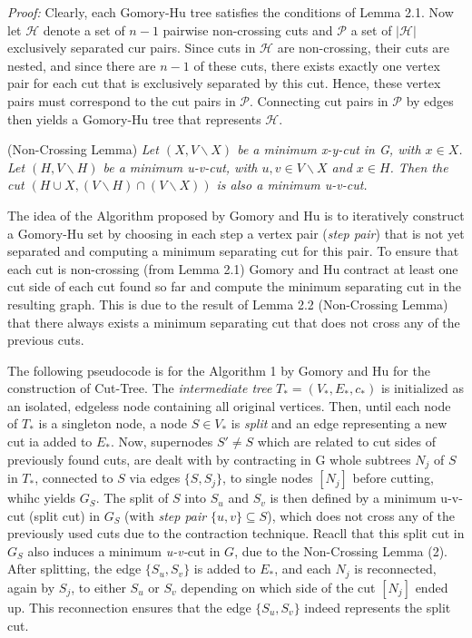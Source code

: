     \vspace{3mm}
    \noindent\textit{Proof:} Clearly, each Gomory-Hu tree satisfies the conditions of Lemma 2.1. Now let $\mathcal{H}$ denote a set of $n-1$ pairwise non-crossing cuts and $\mathcal{P}$ a set of $|\mathcal{H}|$ exclusively separated cur pairs. Since cuts in $\mathcal{H}$ are non-crossing, their cuts are nested, and since there are $n-1$ of these cuts, there exists exactly one vertex pair for each cut that is exclusively separated by this cut. Hence, these vertex pairs must correspond to the cut pairs in $\mathcal{P}$. Connecting cut pairs in $\mathcal{P}$ by edges then yields a Gomory-Hu tree that represents $\mathcal{H}.$

    \vspace{5mm}
     (Non-Crossing Lemma) \textit{Let $(X,V\backslash X)$ be a minimum x-y-cut in G, with $x\in X$. Let $(H,V\backslash H)$ be a minimum u-v-cut, with $u,v\in V\backslash X$ and $x\in H$. Then the cut $(H\cup X, (V\backslash H)\cap (V\backslash X))$ is also a minimum u-v-cut.}
    \vspace{5mm}

    \noindent The idea of the Algorithm proposed by Gomory and Hu is to iteratively construct a Gomory-Hu set by choosing in each step a vertex pair (\textit{step pair}) that is not yet separated and computing a minimum separating cut for this pair. To ensure that each cut is non-crossing (from Lemma 2.1) Gomory and Hu contract at least one cut side of each cut found so far and compute the minimum separating cut in the resulting graph. This is due to the result of Lemma 2.2 (Non-Crossing Lemma) that there always exists a minimum separating cut that does not cross any of the previous cuts. 
    
    The following pseudocode is for the Algorithm 1 by Gomory and Hu for the construction of Cut-Tree. The \textit{intermediate tree} $T_* = (V_*,E_*,c_*)$ is initialized as an isolated, edgeless node containing all original vertices. Then, until each node of $T_*$ is a singleton node, a node $S\in V_*$ is \textit{split} and an edge representing a new cut ia added to $E_*$. Now, supernodes $S'\ne S$ which are related to cut sides of previously found cuts, are dealt with by contracting in G whole subtrees $N_j$ of $S$ in $T_*$, connected to $S$ via edges $\{S,S_j\}$, to single nodes $[N_j]$ before cutting, whihc yields $G_S$. The split of $S$ into $S_u$ and $S_v$ is then defined by a minimum u-v-cut (split cut) in $G_S$ (with \textit{step pair} $\{u,v\} \subseteq S$), which does not cross any of the previously used cuts due to the contraction technique. Reacll that this split cut in $G_S$ also induces a minimum \textit{u-v-}cut in $G$, due to the Non-Crossing Lemma (2). After splitting, the edge $\{S_u,S_v\}$ is added to $E_*$, and each $N_j$ is reconnected, again by $S_j$, to either $S_u$ or $S_v$ depending on which side of the cut $[N_j]$ ended up. This reconnection ensures that the edge $\{S_u,S_v\}$ indeed represents the split cut.

